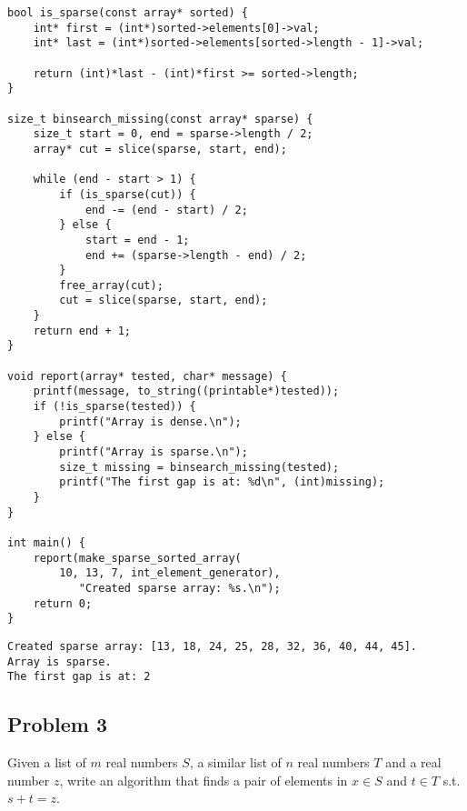 \documentclass[11pt]{article}
\begin{document}
\lstset{language=C,label= ,caption= ,captionpos=b,numbers=none}
\begin{lstlisting}
bool is_sparse(const array* sorted) {
    int* first = (int*)sorted->elements[0]->val;
    int* last = (int*)sorted->elements[sorted->length - 1]->val;

    return (int)*last - (int)*first >= sorted->length;
}

size_t binsearch_missing(const array* sparse) {
    size_t start = 0, end = sparse->length / 2;
    array* cut = slice(sparse, start, end);

    while (end - start > 1) {
        if (is_sparse(cut)) {
            end -= (end - start) / 2;
        } else {
            start = end - 1;
            end += (sparse->length - end) / 2;
        }
        free_array(cut);
        cut = slice(sparse, start, end);
    }
    return end + 1;
}

void report(array* tested, char* message) {
    printf(message, to_string((printable*)tested));
    if (!is_sparse(tested)) {
        printf("Array is dense.\n");
    } else {
        printf("Array is sparse.\n");
        size_t missing = binsearch_missing(tested);
        printf("The first gap is at: %d\n", (int)missing);
    }
}

int main() {
    report(make_sparse_sorted_array(
        10, 13, 7, int_element_generator),
           "Created sparse array: %s.\n");
    return 0;
}
\end{lstlisting}

\begin{verbatim}
Created sparse array: [13, 18, 24, 25, 28, 32, 36, 40, 44, 45].
Array is sparse.
The first gap is at: 2
\end{verbatim}

\subsection{Problem 3}
\label{sec:orgheadline7}
Given a list of \(m\) real numbers \(S\), a similar list of \(n\) real numbers \(T\)
and a real number \(z\), write an algorithm that finds a pair of elements in
\(x \in S\) and \(t \in T\) s.t. \(s + t = z\).
\end{document}
